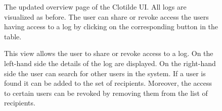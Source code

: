 \documentclass[../main.tex]{subfiles}
\begin{document}
\label{app:screenshots}
\begin{figure}[h!]
    \centering
    \caption{
        The updated overview page of the Clotilde UI. 
        All logs are visualized as before. 
        The user can share or revoke access the users having access to a log by clicking on the corresponding button in the table.}
    \label{app:clotilde-overview}
\end{figure}
\newpage
\begin{figure}[h!]
    \centering
    \caption{
        This view allows the user to share or revoke access to a log. 
        On the left-hand side the details of the log are displayed. 
        On the right-hand side the user can search for other users in the system. 
        If a user is found it can be added to the set of recipients. 
        Moreover, the access to certain users can be revoked by removing them from the list of recipients.}
    \label{app:clotilde-share}
\end{figure}
\end{document}
